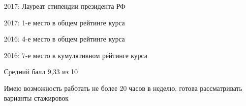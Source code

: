 

\begin{cventries}

\cventry
{} 
{}
{}
{} 
{
 \begin{cvitems}
\item{2017: Лауреат стипендии президента РФ}
\item {2017: 1-е место в общем рейтинге курса}
\item {2016: 4-е место в общем рейтинге курса}
\item {2016: 7-е место в кумулятивном рейтинге курса}
\item {Средний балл 9,33 из 10}
\item {Имею возможность работать не более 20 часов в неделю, готова рассматривать варианты стажировок}
 \end{cvitems}
}

\end{cventries}